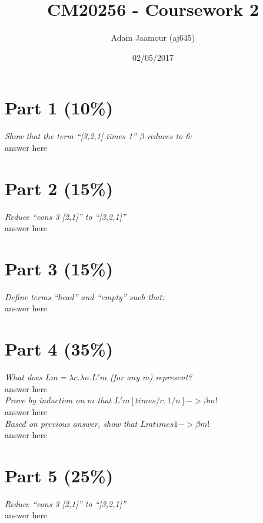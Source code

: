 \documentclass{article}
\title{CM20256 - Coursework 2}
\date{02/05/2017}
\author{Adam Jaamour (aj645)}
\begin{document}
\maketitle
\newpage
\tableofcontents
\newpage
{}

\section{Part 1 (10\%)}
\textit{Show that the term ``[3,2,1] times 1'' $\beta$-reduces to 6:}\\
answer here

\section{Part 2 (15\%)}
\textit{Reduce ``cons 3 [2,1]'' to ``[3,2,1]''}\\
answer here

\section{Part 3 (15\%)}
\textit{Define terms ``head'' and ``empty'' such that:}\\
answer here

\section{Part 4 (35\%)}
\textit{What does $Lm = \lambda c.\lambda n.L'm$ (for any m) represent?}\\
answer here\\
\textit{Prove by induction on $m$ that $L'm [times/c , 1/n] -> \beta m!$}\\
answer here\\
\textit{Based on previous answer, show that $Lm times 1 -> \beta m!$}\\
answer here

\section{Part 5 (25\%)}
\textit{Reduce ``cons 3 [2,1]'' to ``[3,2,1]''}\\
answer here
\end{document}

